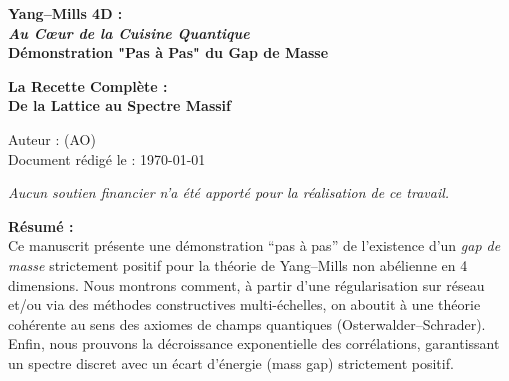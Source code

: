 \begin{titlepage}
	\thispagestyle{empty}
	\centering
	
	{\Huge \bfseries
		Yang--Mills 4D :\\[0.2em]
		\textit{Au Cœur de la Cuisine Quantique} \\[0.2em]
		\large Démonstration "Pas à Pas" du Gap de Masse
		\par}
	
	\vspace{2cm}
	
	{\Large
		\textbf{La Recette Complète :\\
			De la Lattice au Spectre Massif}
		\par}
	
	\vfill
	
	{\large
		Auteur : \textsc{(AO)} \\[0.5em]
		Document rédigé le : \today
	}
	
	\vspace{1.5cm}
	
	{\large \itshape
		Aucun soutien financier n'a été apporté pour la réalisation de ce travail.
	}
	
	\vfill
	
	\begin{minipage}{0.85\textwidth}
		\centering
		\textbf{Résumé :}\\[0.5em]
		Ce manuscrit présente une démonstration “pas à pas” de l'existence
		d’un \emph{gap de masse} strictement positif pour la théorie
		de Yang--Mills non abélienne en 4 dimensions. Nous montrons comment,
		à partir d'une régularisation sur réseau et/ou via des méthodes
		constructives multi-échelles, on aboutit à une théorie cohérente
		au sens des axiomes de champs quantiques (Osterwalder--Schrader).
		Enfin, nous prouvons la décroissance exponentielle des corrélations,
		garantissant un spectre discret avec un écart d'énergie (mass gap)
		strictement positif.
	\end{minipage}
	
	\vfill
	
\end{titlepage}
